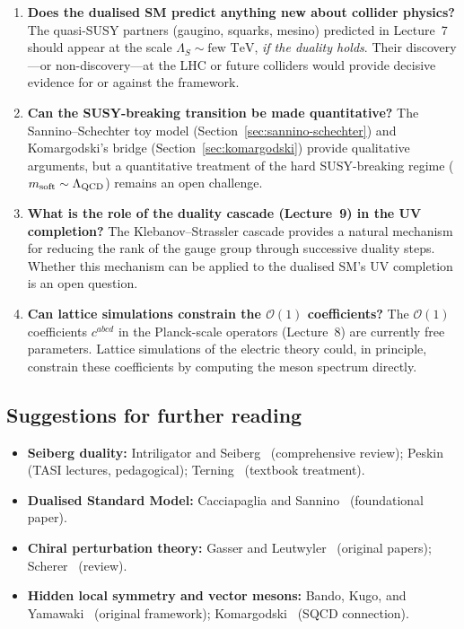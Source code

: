 \documentclass[11pt,a4paper]{article}
\begin{document}
\begin{enumerate}
  \item \textbf{Does the dualised SM predict anything new about
    collider physics?}  The quasi-SUSY partners (gaugino, squarks,
    mesino) predicted in Lecture~7 should appear at the scale
    $\Lambda_S \sim \text{few TeV}$, \emph{if the duality holds}.
    Their discovery---or non-discovery---at the LHC or future
    colliders would provide decisive evidence for or against the
    framework.

  \item \textbf{Can the SUSY-breaking transition be made
    quantitative?}  The Sannino--Schechter toy model
    (Section~\ref{sec:sannino-schechter}) and Komargodski's bridge
    (Section~\ref{sec:komargodski}) provide qualitative arguments, but
    a quantitative treatment of the hard SUSY-breaking regime
    ($m_{\text{soft}} \sim \Lambda_{\mathrm{QCD}}$) remains an open challenge.

  \item \textbf{What is the role of the duality cascade
    (Lecture~9) in the UV completion?}  The Klebanov--Strassler
    cascade provides a natural mechanism for reducing the rank of the
    gauge group through successive duality steps.  Whether this
    mechanism can be applied to the dualised SM's UV completion is
    an open question.

  \item \textbf{Can lattice simulations constrain the $\mathcal{O}(1)$
    coefficients?}  The $\mathcal{O}(1)$ coefficients $c^{abcd}$ in
    the Planck-scale operators (Lecture~8) are currently free
    parameters.  Lattice simulations of the electric theory could, in
    principle, constrain these coefficients by computing the meson
    spectrum directly.
\end{enumerate}


\subsection{Suggestions for further reading}

\begin{itemize}
  \item \textbf{Seiberg duality:}
    Intriligator and Seiberg~\cite{IntriligatorSeiberg1996}
    (comprehensive review); Peskin~\cite{Peskin1997} (TASI lectures,
    pedagogical); Terning~\cite{Terning2006} (textbook treatment).
  \item \textbf{Dualised Standard Model:}
    Cacciapaglia and Sannino~\cite{CacciapagliaSannino2024}
    (foundational paper).
  \item \textbf{Chiral perturbation theory:}
    Gasser and Leutwyler~\cite{GasserLeutwyler1984,GasserLeutwyler1985}
    (original papers); Scherer~\cite{Scherer2003} (review).
  \item \textbf{Hidden local symmetry and vector mesons:}
    Bando, Kugo, and Yamawaki~\cite{BandoKugoYamawaki1988}
    (original framework); Komargodski~\cite{Komargodski2010}
    (SQCD connection).
\end{itemize}
\end{document}
